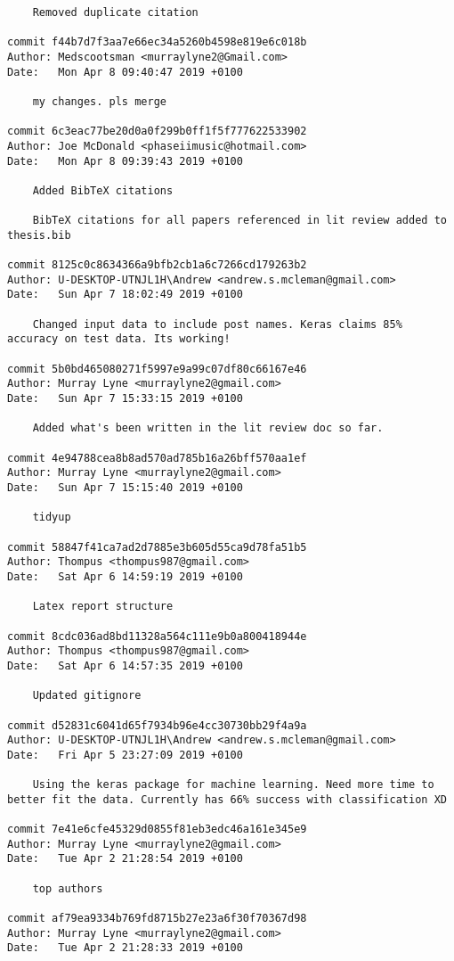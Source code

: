 \begin{lstlisting}
    Removed duplicate citation

commit f44b7d7f3aa7e66ec34a5260b4598e819e6c018b
Author: Medscootsman <murraylyne2@Gmail.com>
Date:   Mon Apr 8 09:40:47 2019 +0100

    my changes. pls merge

commit 6c3eac77be20d0a0f299b0ff1f5f777622533902
Author: Joe McDonald <phaseiimusic@hotmail.com>
Date:   Mon Apr 8 09:39:43 2019 +0100

    Added BibTeX citations
    
    BibTeX citations for all papers referenced in lit review added to thesis.bib

commit 8125c0c8634366a9bfb2cb1a6c7266cd179263b2
Author: U-DESKTOP-UTNJL1H\Andrew <andrew.s.mcleman@gmail.com>
Date:   Sun Apr 7 18:02:49 2019 +0100

    Changed input data to include post names. Keras claims 85% accuracy on test data. Its working!

commit 5b0bd465080271f5997e9a99c07df80c66167e46
Author: Murray Lyne <murraylyne2@gmail.com>
Date:   Sun Apr 7 15:33:15 2019 +0100

    Added what's been written in the lit review doc so far.

commit 4e94788cea8b8ad570ad785b16a26bff570aa1ef
Author: Murray Lyne <murraylyne2@gmail.com>
Date:   Sun Apr 7 15:15:40 2019 +0100

    tidyup

commit 58847f41ca7ad2d7885e3b605d55ca9d78fa51b5
Author: Thompus <thompus987@gmail.com>
Date:   Sat Apr 6 14:59:19 2019 +0100

    Latex report structure

commit 8cdc036ad8bd11328a564c111e9b0a800418944e
Author: Thompus <thompus987@gmail.com>
Date:   Sat Apr 6 14:57:35 2019 +0100

    Updated gitignore

commit d52831c6041d65f7934b96e4cc30730bb29f4a9a
Author: U-DESKTOP-UTNJL1H\Andrew <andrew.s.mcleman@gmail.com>
Date:   Fri Apr 5 23:27:09 2019 +0100

    Using the keras package for machine learning. Need more time to better fit the data. Currently has 66% success with classification XD

commit 7e41e6cfe45329d0855f81eb3edc46a161e345e9
Author: Murray Lyne <murraylyne2@gmail.com>
Date:   Tue Apr 2 21:28:54 2019 +0100

    top authors

commit af79ea9334b769fd8715b27e23a6f30f70367d98
Author: Murray Lyne <murraylyne2@gmail.com>
Date:   Tue Apr 2 21:28:33 2019 +0100


\end{lstlisting}
